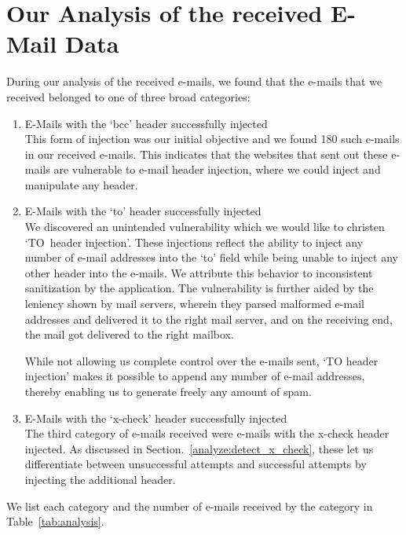 \section[Analysis of Data]{Our Analysis of the received E-Mail Data}
During our analysis of the received e-mails, we found that the e-mails that we received belonged to one of three broad categories:
\begin{enumerate}
	\item E-Mails with the `bcc' header successfully injected\\
	This form of injection was our initial objective and we found 180 such e-mails in our received e-mails. This indicates that the websites that sent out these e-mails are vulnerable to e-mail header injection, where we could inject and manipulate any header.
	
	\item E-Mails with the `to' header successfully injected\\
	We discovered an unintended vulnerability which we would like to christen `TO~header injection'. These injections reflect the ability to inject any number of e-mail addresses into the `to' field while being unable to inject any other header into the e-mails. We attribute this behavior to inconsistent sanitization by the application. 
	The vulnerability is further aided by the leniency shown by mail servers, wherein they parsed malformed e-mail addresses and delivered it to the right mail server, and on the receiving end, the mail got delivered to the right mailbox. 
	
	While not allowing us complete control over the e-mails sent, `TO header injection' makes it possible to append any number of e-mail addresses, thereby enabling us to generate freely any amount of spam.
	
	\item E-Mails with the `x-check' header successfully injected\\
    The third category of e-mails received were e-mails with the x-check header injected. As discussed in Section.~\ref{analyze:detect_x_check}, 
    these let us differentiate between unsuccessful attempts and successful attempts by injecting the additional header. 
\end{enumerate}
We list each category and the number of e-mails received by the category in Table~\ref{tab:analysis}. 

